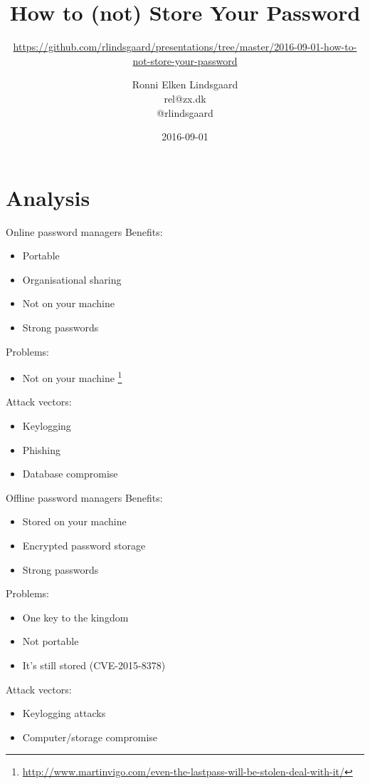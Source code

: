 \documentclass{beamer}
\title{How to (not) Store Your Password}
\subtitle{\url{https://github.com/rlindsgaard/presentations/tree/master/2016-09-01-how-to-not-store-your-password}}
\author{Ronni Elken Lindsgaard \\ rel@zx.dk \\ @rlindsgaard}
\date{2016-09-01}
\begin{document}
\begin{frame}
  \maketitle
\end{frame}

\begin{frame}
  \tableofcontents
\end{frame}

\section{Analysis}
\begin{frame}{Online password managers}
  Benefits:
  \begin{itemize}
    \item Portable
    \item Organisational sharing
    \item Not on your machine
    \item Strong passwords
  \end{itemize}
  Problems:
  \begin{itemize}
    \item Not on your machine \footnote{\url{http://www.martinvigo.com/even-the-lastpass-will-be-stolen-deal-with-it/}}
  \end{itemize}
  Attack vectors:
  \begin{itemize}
    \item Keylogging
    \item Phishing
    \item Database compromise
  \end{itemize}
\end{frame}

\begin{frame}{Offline password managers}
  Benefits:
  \begin{itemize}
    \item Stored on your machine
    \item Encrypted password storage
    \item Strong passwords
  \end{itemize}
  Problems:
  \begin{itemize}
    \item One key to the kingdom
    \item Not portable
    \item It's still stored (CVE-2015-8378)
  \end{itemize}
  Attack vectors:
  \begin{itemize}
    \item Keylogging attacks
    \item Computer/storage compromise
  \end{itemize}
\end{frame}
\end{document}
